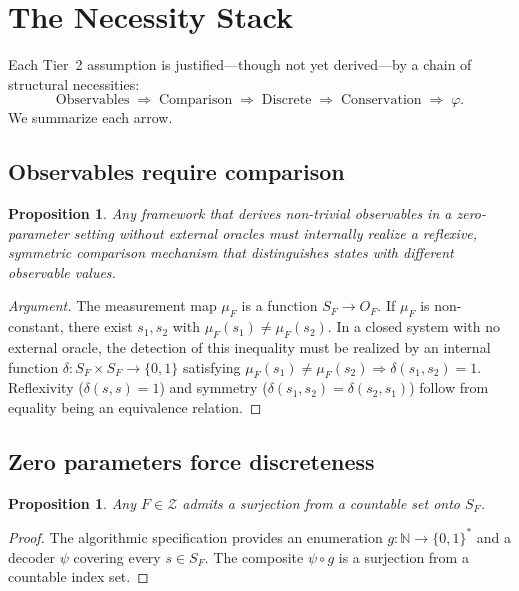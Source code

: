 \documentclass[11pt]{article}
\newcommand{\N}{\mathbb{N}}
\newcommand{\cZ}{\mathcal{Z}}
\newtheorem{proposition}[theorem]{Proposition}
\theoremstyle{definition}
\theoremstyle{remark}
\begin{document}
\section{The Necessity Stack}\label{sec:necessity}

Each Tier~2 assumption is justified---though not yet derived---by
a chain of structural necessities:
\[
\text{Observables}
\;\Rightarrow\; \text{Comparison}
\;\Rightarrow\; \text{Discrete}
\;\Rightarrow\; \text{Conservation}
\;\Rightarrow\; \varphi.
\]
We summarize each arrow.

\subsection{Observables require comparison}

\begin{proposition}\label{prop:obs-comparison}
Any framework that derives non-trivial observables in a
zero-parameter setting without external oracles must internally
realize a reflexive, symmetric comparison mechanism that
distinguishes states with different observable values.
\end{proposition}

\begin{proof}[Argument]
The measurement map $\mu_F$ is a function $S_F \to O_F$.
If $\mu_F$ is non-constant, there exist $s_1, s_2$ with
$\mu_F(s_1) \neq \mu_F(s_2)$.
In a closed system with no external oracle, the detection
of this inequality must be realized by an internal function
$\delta : S_F \times S_F \to \{0,1\}$ satisfying
$\mu_F(s_1) \neq \mu_F(s_2) \Rightarrow \delta(s_1, s_2) = 1$.
Reflexivity ($\delta(s,s) = 1$) and symmetry
($\delta(s_1, s_2) = \delta(s_2, s_1)$) follow from equality
being an equivalence relation.
\end{proof}

\subsection{Zero parameters force discreteness}

\begin{proposition}\label{prop:discrete}
Any $F \in \cZ$ admits a surjection from a countable set onto $S_F$.
\end{proposition}
\begin{proof}
The algorithmic specification provides an enumeration
$g : \N \to \{0,1\}^*$ and a decoder $\psi$ covering every
$s \in S_F$.
The composite $\psi \circ g$ is a surjection from a countable
index set.
\end{proof}
\end{document}
